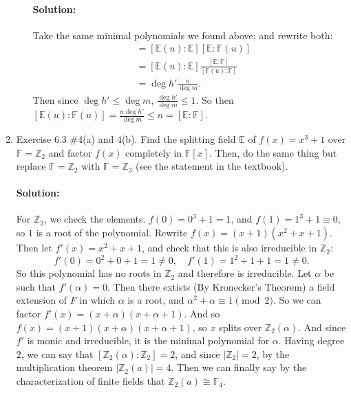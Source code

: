 \documentclass{article}
\begin{document}
\begin{enumerate}
\begin{enumerate}
        \paragraph{Solution:} Take the same minimal polynomials we found above; and rewrite both:
        \begin{align*}
            [\mathbb{E}(u):\mathbb{F}(u)]&=[\mathbb{E}(u):\mathbb{E}][\mathbb{E}:\mathbb{F}(u)]\\
                                         &=[\mathbb{E}(u):\mathbb{E}]\frac{[\mathbb{E}:\mathbb{F}]}{[\mathbb{F}(u):\mathbb{F}]}\\
                                         &= \deg h' \frac{n}{\deg m} 
        .\end{align*}
        Then since $\deg h' \leq \deg m$, $\frac{\deg h'}{\deg m}\leq 1$. So then $[\mathbb{E}(u):\mathbb{F}(u)]=\frac{n\deg h'}{\deg m}\leq n=[\mathbb{E}:\mathbb{F}].$
\end{enumerate}

\item Exercise 6.3 \#4(a) and 4(b). Find the splitting field $\mathbb{E}$ of $f(x)=x^3+1$ over $\mathbb{F}=\mathbb{Z}_2$
and factor $f(x)$ completely in $\mathbb{F}[x].$ Then, do the same thing but replace $\mathbb{F}=\mathbb{Z}_2$
with $\mathbb{F}=\mathbb{Z}_3$ (see the statement in the textbook).

\paragraph{Solution:} For $\mathbb{Z}_2$, we check the elements. $f(0)=0^3+1=1$, and $f(1)=1^3+1\equiv 0$, so $1$ is a root of the polynomial.
Rewrite $f(x)=(x+1)(x^2+x+1)$. Then let $f'(x)=x^2+x+1$, and check that this is also irreducible in $\mathbb{Z}_2$:
\[
f'(0)=0^2+0+1= 1\neq 0,\quad f'(1)=1^2+1+1=1\neq 0
.\] 
So this polynomial has no roots in $\mathbb{Z}_2$ and therefore is irreducible. Let $\alpha$ be such that $f'(\alpha)=0$. Then there extists (By Kronecker's Theorem) a field extension
of $F$ in which $\alpha$ is a root, and $\alpha^2+\alpha\equiv  1\pmod{2} $.
So we can factor $f'(x)=(x+\alpha)(x+\alpha+1)$. And so $f(x)=(x+1)(x+\alpha)(x+\alpha+1)$, so $x$ splits over $\mathbb{Z}_2(\alpha)$.
And since  $f'$ is monic and irreducible, it is the minimal polynomial for $\alpha$. Having degree $2$, we can say that $[\mathbb{Z}_2(\alpha):\mathbb{Z}_2]=2$, and since
$|\mathbb{Z}_2|=2$, by the multiplication theorem $|\mathbb{Z}_2(a)|=4$. Then we can finally say by the characterization of finite fields that
$\mathbb{Z}_2(a)\cong \mathbb{F}_4$.


\end{enumerate}
\end{document}

